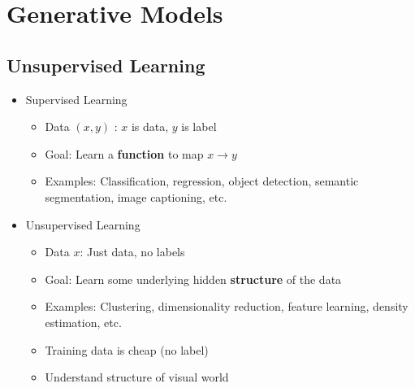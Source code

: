 \section{Generative Models}
\subsection{Unsupervised Learning}
\begin{itemize}
	\item Supervised Learning
	\begin{itemize}
		\item Data $(x, y)$ : $x$ is data, $y$ is label
		\item Goal: Learn a \textbf{function} to map $x \rightarrow y$
		\item Examples: Classification, regression, object detection, semantic segmentation, image captioning, etc.
	\end{itemize}
	\item Unsupervised Learning
	\begin{itemize}
		\item Data $x$: Just data, no labels
		\item Goal: Learn some underlying hidden \textbf{structure} of the data
		\item Examples: Clustering, dimensionality reduction, feature learning, density estimation, etc.
		\item Training data is cheap (no label)
		\item Understand structure of visual world
	\end{itemize}
\end{itemize}

